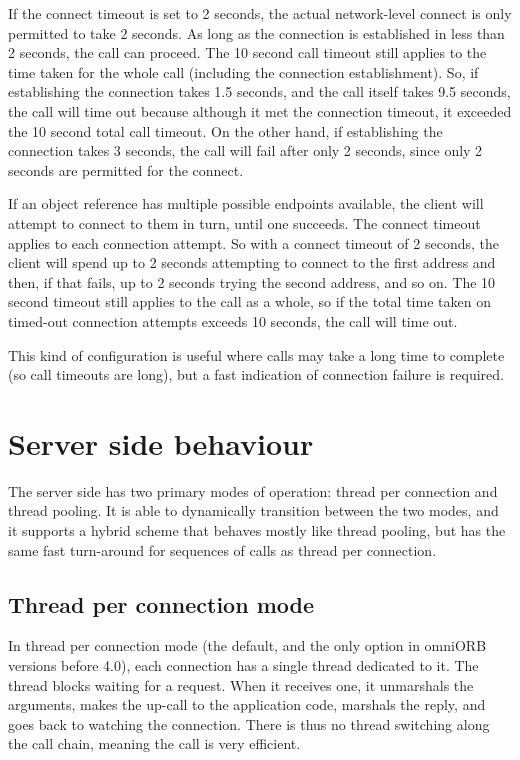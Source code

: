 \documentclass[11pt,oneside,a4paper]{book}
\begin{document}
If the connect timeout is set to 2 seconds, the actual network-level
connect is only permitted to take 2 seconds. As long as the connection
is established in less than 2 seconds, the call can proceed. The 10
second call timeout still applies to the time taken for the whole call
(including the connection establishment). So, if establishing the
connection takes 1.5 seconds, and the call itself takes 9.5 seconds,
the call will time out because although it met the connection timeout,
it exceeded the 10 second total call timeout. On the other hand, if
establishing the connection takes 3 seconds, the call will fail after
only 2 seconds, since only 2 seconds are permitted for the connect.

If an object reference has multiple possible endpoints available, the
client will attempt to connect to them in turn, until one succeeds.
The connect timeout applies to each connection attempt. So with a
connect timeout of 2 seconds, the client will spend up to 2 seconds
attempting to connect to the first address and then, if that fails, up
to 2 seconds trying the second address, and so on. The 10 second
timeout still applies to the call as a whole, so if the total time
taken on timed-out connection attempts exceeds 10 seconds, the call
will time out.

This kind of configuration is useful where calls may take a long time
to complete (so call timeouts are long), but a fast indication of
connection failure is required.


\section{Server side behaviour}

The server side has two primary modes of operation: thread per
connection and thread pooling. It is able to dynamically transition
between the two modes, and it supports a hybrid scheme that behaves
mostly like thread pooling, but has the same fast turn-around for
sequences of calls as thread per connection.

\subsection{Thread per connection mode}

In thread per connection mode (the default, and the only option in
omniORB versions before 4.0), each connection has a single thread
dedicated to it. The thread blocks waiting for a request. When it
receives one, it unmarshals the arguments, makes the up-call to the
application code, marshals the reply, and goes back to watching the
connection. There is thus no thread switching along the call chain,
meaning the call is very efficient.
\end{document}
